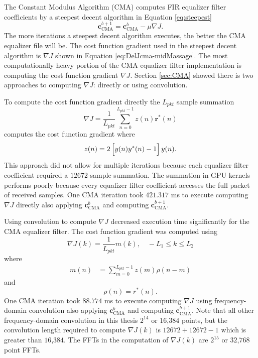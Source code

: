 The Constant Modulus Algorithm (CMA) computes FIR equalizer filter coefficients by a steepest decent algorithm in Equation \eqref{eq:steepest}
\begin{equation}
\mathbf{c}_\text{CMA}^{b+1} = \mathbf{c}_\text{CMA}^{b}-\mu \nabla J.
\end{equation}
The more iterations a steepest decent algorithm executes, the better the CMA equalizer file will be.
The cost function gradient used in the steepest decent algorithm is $\nabla J$ shown in Equation \eqref{eq:DelJcma-midMassage}.
The most computationally heavy portion of the CMA equalizer filter implementation is computing the cost function gradient $\nabla J$.
Section \ref{sec:CMA} showed there is two approaches to computing $\nabla J$: directly or using convolution.

To compute the cost function gradient directly the $L_{pkt}$ sample summation
\begin{equation}
	\nabla J = \frac{1}{L_{pkt}} \sum_{n=0}^{L_{pkt}-1}
	z(n)  \mathbf{r}^\ast(n)
	\label{eq:CMA_challenge}
\end{equation}
computes the cost function gradient where
\begin{equation}
z(n) = 	2\left[ \vphantom{\displaystyle\sum}  y(n) y^\ast(n) - 1 \right] y(n).
\end{equation}
This approach did not allow for multiple iterations because each equalizer filter coefficient required a $12672$-sample summation.
The summation in GPU kernels performs poorly because every equalizer filter coefficient accesses the full packet of received samples.
One CMA iteration took $421.317$ ms to execute computing $\nabla J$ directly also applying $\mathbf{c}_\text{CMA}^{b}$ and computing $\mathbf{c}_\text{CMA}^{b+1}$.


Using convolution to compute $\nabla J$ decreased execution time significantly for the CMA equalizer filter.
The cost function gradient was computed using
\begin{equation}
\nabla J(k) = \frac{1}{L_{pkt}} m(k), \quad -L_1 \leq k \leq L_2
\end{equation}
where
\begin{align}
m(n) &= \sum^{L_{pkt}-1}_{m=0} z(m) \rho(n-m)
\end{align}
and
\begin{equation}
\rho(n) = r^\ast(n).
\end{equation}
One CMA iteration took $88.774$ ms to execute computing $\nabla J$ using frequency-domain convolution also applying $\mathbf{c}_\text{CMA}^{b}$ and computing $\mathbf{c}_\text{CMA}^{b+1}$.
Note that all other frequency-domain convolution in this thesis $2^{14}$ or $16$,$384$ points, but the convolution length required to compute $\nabla J(k)$ is $12672+12672-1$ which is greater than $16$,$384$. 
The FFTs in the computation of $\nabla J(k)$ are $2^{15}$ or $32$,$768$ point FFTs.

